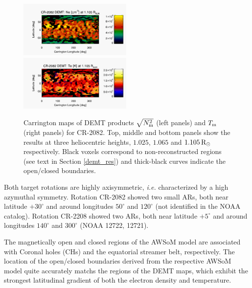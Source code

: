 \documentclass[namedreferences]{solarphysics}
\newcommand{\mdeg}{^\circ}
\newcommand{\mrsun}{{\rm R_\odot}}
\newcommand{\Tm}{T_{\rm m}}
\newcommand{\Nsqm}{N^2_{{\rm m}}}
\newcommand{\sqravgN}{\sqrt{\Nsqm}}
\begin{document}
\begin{article}
\begin{figure}[h!]
\begin{center}
\includegraphics[width=0.495\textwidth]{figs/map_Ne_CR2082_DEMT-EUVI_behind_H1-L3523_r3d_1105_Rsun.pdf}
\includegraphics[width=0.495\textwidth]{figs/map_Tm_CR2082_DEMT-EUVI_behind_H1-L3523_r3d_1105_Rsun.pdf}
\caption{Carrington maps of DEMT {products $\sqravgN$} (left panels) and $\Tm$ (right panels) for CR-2082. Top, middle and bottom panels show the results at three heliocentric heights, $1.025$, $1.065$ and $1.105\,\mrsun$ respectively. Black voxels correspond to non-reconstructed regions (see text in Section \ref{demt_res}) and thick-black curves indicate the open/closed boundaries.}
\label{carmaps_demt_2082}
\end{center}
\end{figure}

{Both target rotations are highly axisymmetric, \textit{i.e.} characterized by a high azymuthal symmetry. Rotation CR-2082} showed two {small} ARs, both near latitude $+30\mdeg$ and {around longitudes} $50\mdeg$ and $120\mdeg$  {(not identified in the NOAA catalog)}. {Rotation CR-2208} showed two {ARs, both near latitude} $+5\mdeg$ and {around longitudes $140\mdeg$ and $300\mdeg$ {(NOAA 12722, 12721)}.} 

{The magnetically open and closed regions of the AWSoM model are associated with Coronal holes (CHs) and the equatorial streamer belt, respectively. The {location of the} open/closed boundaries derived from the respective AWSoM model quite accurately matchs {the regions of the DEMT maps, which exhibit the strongest latitudinal gradient of both the electron density and temperature.}}


\end{article}
\end{document}
